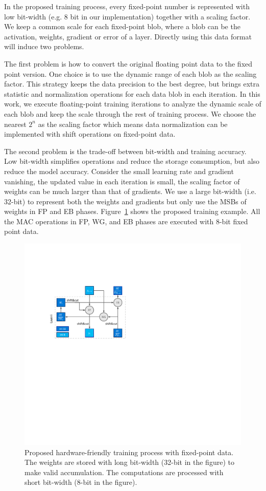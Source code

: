 In the proposed training process, every fixed-point number is represented with low bit-width (e.g. 8 bit in our implementation) together with a scaling factor. We keep a common scale for each fixed-point blob, where a blob can be the activation, weights, gradient or error of a layer. Directly using this data format will induce two problems.

The first problem is how to convert the original floating point data to the fixed point version. One choice is to use the dynamic range of each blob as the scaling factor. This strategy keeps the data precision to the best degree, but brings extra statistic and normalization operations for each data blob in each iteration. In this work, we execute floating-point training iterations to analyze the dynamic scale of each blob and keep the scale through the rest of training process. We choose the nearest $2^n$ as the scaling factor which means data normalization can be implemented with shift operations on fixed-point data.

The second problem is the trade-off between bit-width and training accuracy. Low bit-width simplifies operations and reduce the storage consumption, but also reduce the model accuracy. Consider the small learning rate and gradient vanishing, the updated value in each iteration is small, the scaling factor of weights can be much larger than that of gradients. We use a large bit-width (i.e. 32-bit) to represent both the weights and gradients but only use the MSBs of weights in FP and EB phases. Figure~\ref{fig:fixed_train} shows the proposed training example. All the MAC operations in FP, WG, and EB phases are executed with 8-bit fixed point data.  

\begin{figure}[tb]
  \centering 
  \includegraphics[width=0.9\columnwidth]{figures/fixed_train.pdf}
  \caption{Proposed hardware-friendly training process with fixed-point data. The weights are stored with long bit-width (32-bit in the figure) to make valid accumulation. The computations are processed with short bit-width (8-bit in the figure).}
  \label{fig:fixed_train}
\end{figure}


